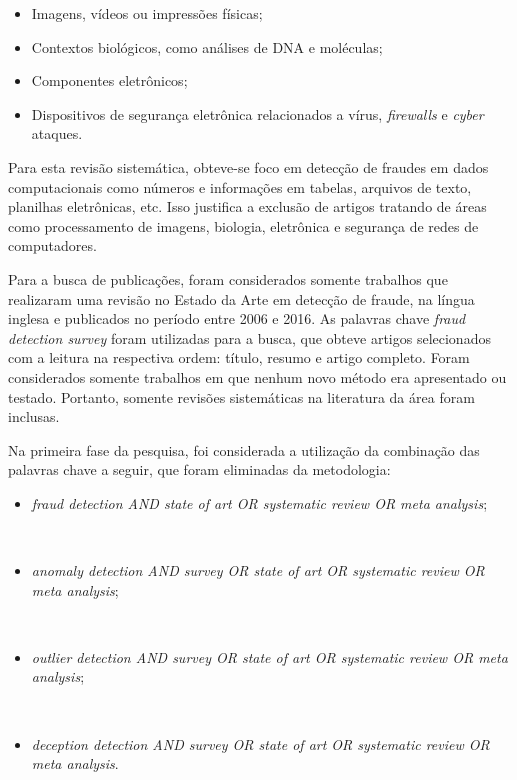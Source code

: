 \documentclass[smallextended]{svjour3}
\begin{document}
\begin{itemize}
	\item Imagens, vídeos ou impressões físicas;
	
	\item Contextos biológicos, como análises de DNA e moléculas;
	
	\item Componentes eletrônicos; 	
	
	\item Dispositivos de segurança eletrônica relacionados a vírus, \emph{firewalls} e \emph{cyber} ataques.
\end{itemize}

Para esta revisão sistemática, obteve-se foco em detecção de fraudes em dados computacionais como números e informações em tabelas, arquivos de texto, planilhas eletrônicas, etc. Isso justifica a exclusão de artigos tratando de áreas como processamento de imagens, biologia, eletrônica e segurança de redes de computadores.

Para a busca de publicações, foram considerados somente trabalhos que realizaram uma revisão no Estado da Arte em detecção de fraude, na língua inglesa e publicados no período entre 2006 e 2016. As palavras chave \emph{fraud detection survey} foram utilizadas para a busca, que obteve artigos selecionados com a leitura na respectiva ordem: título, resumo e artigo completo. Foram considerados somente trabalhos em que nenhum novo método era apresentado ou testado. Portanto, somente revisões sistemáticas na literatura da área foram inclusas.

Na primeira fase da pesquisa, foi considerada a utilização da combinação das palavras chave a seguir, que foram eliminadas da metodologia:

\begin{itemize}
	\item \emph{fraud detection AND state of art OR systematic review OR meta analysis};
	
	\
	\item \emph{anomaly detection AND survey OR state of art OR systematic review OR meta analysis};
	
	\
	\item \emph{outlier detection AND survey OR state of art OR systematic review OR meta analysis}; 	
	
	\
	\item \emph{deception detection AND survey OR state of art OR systematic review OR meta analysis}.
\end{itemize}
\end{document}
